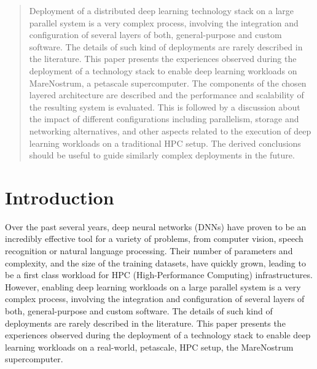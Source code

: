 \documentclass[journal]{IEEEtran}
\begin{document}
\begin{abstract}
Deployment of a distributed deep learning technology stack on a large parallel system is a very complex process, involving the integration and configuration of several layers of both, general-purpose and custom software. The details of such kind of deployments are rarely described in the literature. This paper presents the experiences observed during the deployment of a technology stack to enable deep learning workloads on MareNostrum, a petascale supercomputer. The components of the chosen layered architecture are described and the performance and scalability of the resulting system is evaluated. This is followed by a discussion about the impact of different configurations including parallelism, storage and networking alternatives, and other aspects related to the execution of deep learning workloads on a traditional HPC setup. The derived conclusions should be useful to guide similarly complex deployments in the future.

\end{abstract}



\section{Introduction}

Over the past several years, deep neural networks (DNNs) have proven to be an incredibly effective tool for a variety of problems, from computer vision, speech recognition or natural language processing. Their number of parameters and complexity, and the size of the training datasets, have quickly grown, leading to be a first class workload for HPC (High-Performance Computing) infrastructures. However, enabling deep learning workloads on a large parallel system is a very complex process, involving the integration and configuration of several layers of both, general-purpose and custom software. The details of such kind of deployments are rarely described in the literature. This paper presents the experiences observed during the deployment of a technology stack to enable deep learning workloads on a real-world, petascale, HPC setup, the MareNostrum supercomputer. 
\end{document}
